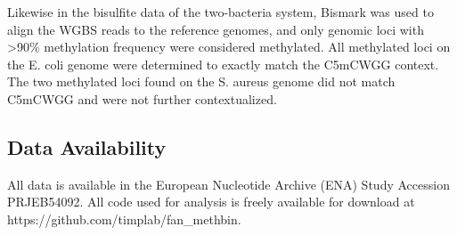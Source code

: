Likewise in the bisulfite data of the two-bacteria system, Bismark was used to align the WGBS reads to the reference genomes, and only genomic loci with >90\% methylation frequency were considered methylated. All methylated loci on the E. coli genome were determined to exactly match the C5mCWGG context. The two methylated loci found on the S. aureus genome did not match C5mCWGG and were not further contextualized.

\subsection{Data Availability}
\label{sec:methods}

All data is available in the European Nucleotide Archive (ENA) Study Accession PRJEB54092. All code used for analysis is freely available for download at https://github.com/timplab/fan\_methbin.
